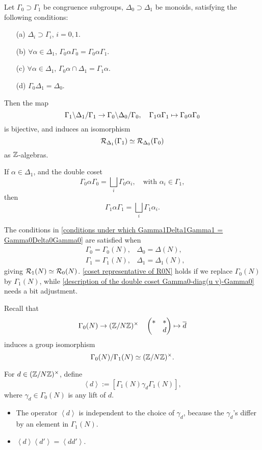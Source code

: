 \begin{proposition}\label{conditions under which Gamma1Delta1Gamma1 = Gamma0Delta0Gamma0}
    Let $\Gamma_0\supset \Gamma_1$ be congruence subgroups, $\Delta_0\supset \Delta_1$ be monoids, satisfying the following conditions:\begin{enumerate}
    \item [(a)] $\Delta_i\supset\Gamma_i$, $i = 0, 1$.
    \item [(b)] $\forall\alpha\in \Delta_1$, $\Gamma_0\alpha\Gamma_0 = \Gamma_0\alpha\Gamma_1$.
    \item [(c)] $\forall\alpha\in\Delta_1$,
    $\Gamma_0\alpha\cap\Delta_1 = \Gamma_1\alpha$.
    \item [(d)] $\Gamma_0\Delta_1 = \Delta_0$.
    \end{enumerate}
    Then the map \[{\Gamma_1}\backslash {\Delta_1}\slash {\Gamma_1}\to{\Gamma_0}\backslash {\Delta_0}\slash {\Gamma_0},\quad \Gamma_1\alpha\Gamma_1\mapsto \Gamma_0\alpha\Gamma_0\] is bijective, and induces an isomorphism \[\mathcal{R}_{\Delta_1}(\Gamma_1)\simeq\mathcal{R}_{\Delta_0}(\Gamma_0)\]
    as $\mathbb{Z}$-algebras.
    
    If $\alpha\in\Delta_1$, and the double coset \[\Gamma_0\alpha\Gamma_0 = \bigsqcup_i \Gamma_0\alpha_i,\quad\text{with }\alpha_i\in\Gamma_1,\]
    then \[\Gamma_1\alpha\Gamma_1 = \bigsqcup_i\Gamma_1\alpha_i.\]
\end{proposition}
The conditions in \cref{conditions under which Gamma1Delta1Gamma1 = Gamma0Delta0Gamma0} are satisfied when \[\begin{matrix}
    &\Gamma_0 = \Gamma_0(N), &\Delta_0 = \Delta(N),\\
    &\Gamma_1 = \Gamma_1(N), &\Delta_1 = \Delta_1(N),
\end{matrix}\]
giving $\mathcal{R}_{1}(N)\simeq\mathcal{R}_0(N)$.
\cref{coset representative of R0N} holds if we replace $\Gamma_0(N)$ by $\Gamma_1(N)$,
while \cref{description of the double coset Gamma0-diag(u v)-Gamma0} needs a bit adjustment.

Recall that \[\Gamma_0(N)\to(\mathbb{Z}/N\mathbb{Z})^\times\quad \begin{pmatrix}
    *&*\\*&d
\end{pmatrix}\mapsto \overline{d}\] induces a group isomorphism \[\Gamma_0(N)/\Gamma_1(N)\simeq (\mathbb{Z}/N\mathbb{Z})^\times.\]
\begin{definition}
    For $d\in(\mathbb{Z}/N\mathbb{Z})^\times$, define \[\left<d\right> := [\Gamma_1(N)\gamma_d\Gamma_1(N)],\]
    where $\gamma_d\in\Gamma_0(N)$ is any lift of $d$.
\end{definition}
\begin{itemize}
    \item The operator $\left<d\right>$ is independent to the choice of $\gamma_d$, because the $\gamma_d$'s differ by an element in $\Gamma_1(N)$.
    \item $\left< d\right>\left<d'\right> = \left<dd'\right>$.
\end{itemize}

